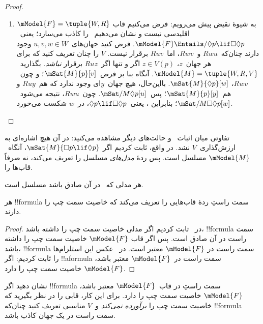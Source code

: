\documentclass[../../../include/open-logic-section]{subfiles}
\begin{document}
\begin{proof}
\begin{enumerate}
    بر فرض، ، یعنی~$\Box p \lif \Box \Box p$، در~$u$ صادق است؛
    پس~$\mSat{M}{\Box \Box p}[u]$. چون~$Ruv$ و~$Rvw$،
    $\mSat{M}{p}[w]$؛ اما بنا بر تعریف~$V$ این تنها هنگامی ممکن است که
    $Ruw$، چنان‌که می‌خواستیم.
  \item به شیوهٔ نقیض پیش می‌رویم: فرض می‌کنیم قاب
    $\mModel{F} = \tuple{W, R}$ اقلیدسی نیست و نشان می‌دهیم~ را
    کاذب می‌سازد؛ یعنی~$\mModel{F} \Entails/ \Diamond p \lif
      \Box\Diamond p$. فرض کنید جهان‌های~$u,v,w \in W$ وجود دارند
    چنان‌که~$Rwu$ و~$Rwv$، اما~$Ruv$ برقرار نیست. $V$ را چنان تعریف
    کنید که برای هر جهان~$z$، $z \in V(p)$ اگر و تنها اگر~$Ruz$
    برقرار \emph{نباشد}. بگذارید~$\mModel{M} =\tuple{W, R,V}$. آنگاه
    بنا بر فرض~$\mSat{M}{p}[v]$؛ و چون~$Rwv$،
    $\mSat{M}{\Diamond p}[w]$. بااین‌حال، هیچ جهان~$y$ای وجود ندارد که
    هم~$Ruy$ و هم~$\mSat{M}{p}[y]$؛ پس~$\mSat/{M}{\Diamond p}[u]$.
    چون~$Rwu$، نتیجه می‌شود~$\mSat/{M}{\Box\Diamond p}[w]$؛ بنابراین
    ، یعنی~$\Diamond p \lif \Box\Diamond p$، در~$w$ شکست
    می‌خورد.
  \end{enumerate}
\end{proof}

تفاوتی میان اثبات~ و حالت‌های دیگر مشاهده می‌کنید: در آن هیچ
اشاره‌ای به ارزش‌گذاری~$V$ نشد. در واقع، ثابت کردیم اگر
$\mSat{M}{\Box p \lif \Diamond p}$، آنگاه~$\mModel{M}$ مسلسل است. پس
 ردهٔ \emph{مدل‌های} مسلسل را تعریف می‌کند، نه صرفاً قاب‌ها را.

\begin{cor}
  هر مدلی که~ در آن صادق باشد مسلسل است.
\end{cor}

\begin{cor}
هر !!{formula} سمت راستِ  ردهٔ قاب‌هایی را تعریف
می‌کند که خاصیت سمت چپ را دارند.
\end{cor}

\begin{proof}
  در~ ثابت کردیم اگر مدلی خاصیت سمت چپ را
  داشته باشد، !!{formula} سمت راست در آن صادق است. پس اگر قاب
  $\mModel{F}$ خاصیت سمت چپ را داشته باشد، !!{formula} سمت راست در
  $\mModel{F}$ معتبر است. در~ عکس این
  استلزام‌ها را ثابت کردیم: اگر !!a{formula} سمت راست در~$\mModel{F}$
  معتبر باشد، $\mModel{F}$ خاصیت سمت چپ را دارد.
\end{proof}

\begin{prob}
نشان دهید اگر !!{formula} سمت راستِ
 در قاب~$\mModel{F}$ معتبر باشد،
$\mModel{F}$ خاصیت سمت چپ را دارد. برای این کار، قابی را در نظر بگیرید
که خاصیت سمت چپ را \emph{برآورده نمی‌کند} و~$V$ مناسبی تعریف کنید
چنان‌که !!{formula} سمت راست در یک جهان کاذب باشد.
\end{prob}
\end{document}
